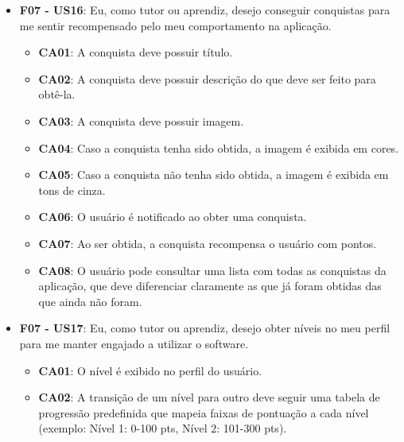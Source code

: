\begin{itemize}
\begin{itemize}
\end{itemize}


\item \textbf{F07 - US16}: Eu, como tutor ou aprendiz, desejo conseguir conquistas para me sentir recompensado pelo meu comportamento na aplicação.

\begin{itemize}

\item \textbf{CA01}: A conquista deve possuir título.

\item \textbf{CA02}: A conquista deve possuir descrição do que deve ser feito para obtê-la.

\item \textbf{CA03}: A conquista deve possuir imagem.

\item \textbf{CA04}: Caso a conquista tenha sido obtida, a imagem é exibida em cores.

\item \textbf{CA05}: Caso a conquista não tenha sido obtida, a imagem é exibida em tons de cinza.

\item \textbf{CA06}: O usuário é notificado ao obter uma conquista.

\item \textbf{CA07}: Ao ser obtida, a conquista recompensa o usuário com pontos.

\item \textbf{CA08}: O usuário pode consultar uma lista com todas as conquistas da aplicação, que deve diferenciar claramente as que já foram obtidas das que ainda não foram.

\end{itemize}

\item \textbf{F07 - US17}: Eu, como tutor ou aprendiz, desejo obter níveis no meu perfil para me manter engajado a utilizar o software.

\begin{itemize}

\item \textbf{CA01}: O nível é exibido no perfil do usuário.

\item \textbf{CA02}: A transição de um nível para outro deve seguir uma tabela de progressão predefinida que mapeia faixas de pontuação a cada nível (exemplo: Nível 1: 0-100 pts, Nível 2: 101-300 pts).


\end{itemize}
\end{itemize}
